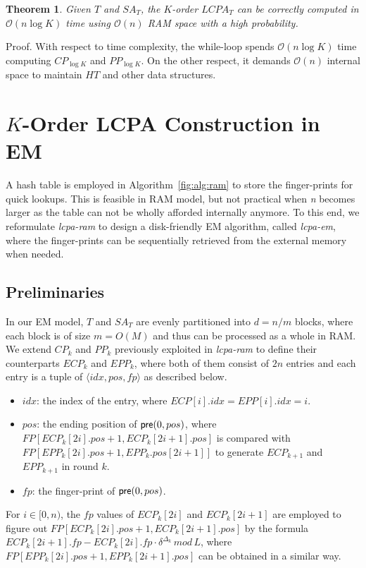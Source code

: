 \documentclass{llncs}
\newtheorem{thm}{Theorem}
\begin{document}
\begin{thm}
\label{thm:lcp:ram}
Given $T$ and $SA_T$, the $K$-order $LCPA_T$ can be correctly computed in $\mathcal{O}(n\log K)$ time using $\mathcal{O}(n)$ {RAM} space with a high probability.
\end{thm}
Proof. With respect to time complexity, the while-loop spends $\mathcal{O}(n\log K)$ time computing $CP_{\log K}$ and $PP_{\log K}$. On the other respect, it demands $\mathcal{O}(n)$ internal space to maintain $HT$ and other data structures.

\section{$K$-Order LCPA Construction in EM}\label{sec:construction_in_em}

A hash table is employed in Algorithm~\ref{fig:alg:ram} to store the finger-prints for quick lookups. This is feasible in {RAM} model, but not practical when {\em n} becomes larger as the table can not be wholly afforded internally anymore. To this end, we reformulate {\em lcpa-ram} to design a disk-friendly {EM} algorithm, called {\em lcpa-em}, where the finger-prints can be sequentially retrieved from the external memory when needed.

\subsection{Preliminaries}

In our {EM} model, $T$ and $SA_T$ are evenly partitioned into $d=n/m$ blocks, where each block is of size $m=O(M)$ and thus can be processed as a whole in {RAM}. We extend $CP_k$ and $PP_k$ previously exploited in {\em lcpa-ram} to define their counterparts $ECP_k$ and $EPP_k$, where both of them consist of $2n$ entries and each entry is a tuple of $\langle idx, pos, fp \rangle$ as described below.
\begin{itemize}
\item $idx$: the index of the entry, where $ECP[i].idx=EPP[i].idx=i$.
\item $pos$: the ending position of ${\sf pre}(0,pos)$, where $FP[ECP_k[2i].pos+1,ECP_k[2i+1].pos]$ is compared with $FP[EPP_k[2i].pos+1,EPP_k.pos[2i+1]]$ to generate $ECP_{k+1}$ and $EPP_{k+1}$ in round $k$.
\item $fp$: the finger-print of ${\sf pre}(0,pos)$.
\end{itemize}

For $i\in [0,n)$, the $fp$ values of $ECP_k[2i]$ and $ECP_k[2i+1]$ are employed to figure out $FP[ECP_k[2i].pos+1, ECP_k[2i+1].pos]$ by the formula $ECP_k[2i+1].fp - ECP_k[2i].fp \cdot \delta^{\Delta_k} \, mod \, L$, where $FP[EPP_k[2i].pos+1, EPP_k[2i+1].pos]$ can be obtained in a similar way.
\end{document}
